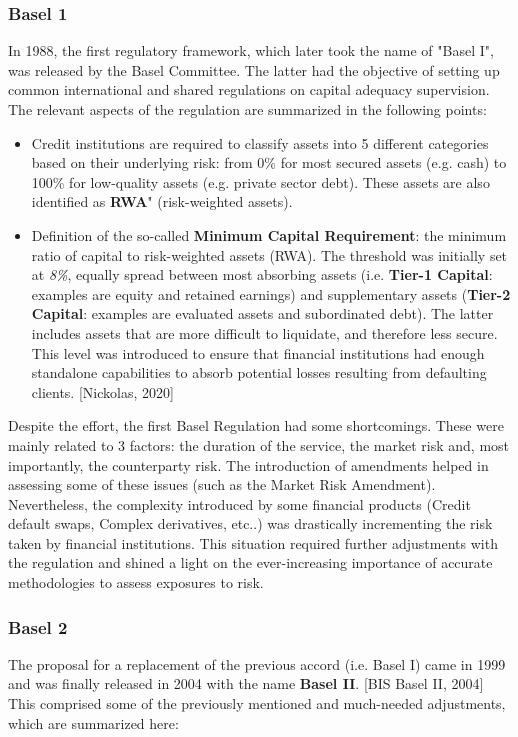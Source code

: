 \documentclass[a4paper,12pt]{article}
\begin{document}
    \subsubsection[]{Basel 1}
    In 1988, the first regulatory framework, which later took the name of "Basel I", 
    was released by the Basel Committee. The latter had the objective of setting up 
    common international and shared regulations on capital adequacy supervision. 
    The relevant aspects of the regulation are summarized in the following points:
    
    \begin{itemize}
        \item Credit institutions are required to classify assets into 5 different categories based on their underlying risk: from 0\% for most secured assets (e.g. cash) to 100\% for low-quality assets (e.g. private sector debt). These assets are also identified as \textbf{RWA}" (risk-weighted assets).
        \item Definition of the so-called \textbf{Minimum Capital Requirement}: the minimum ratio of capital to risk-weighted assets (RWA). The threshold was initially set at \textit{8\%}, equally spread between most absorbing assets (i.e. \textbf{Tier-1 Capital}: examples are equity and retained earnings) and supplementary assets (\textbf{Tier-2 Capital}: examples are evaluated assets and subordinated debt). The latter includes assets that are more difficult to liquidate, and therefore less secure. This level was introduced to ensure that financial institutions had enough standalone capabilities to absorb potential losses resulting from defaulting clients. [Nickolas, 2020]
    \end{itemize}
    
    Despite the effort, the first Basel Regulation had some shortcomings. 
    These were mainly related to 3 factors: 
    the duration of the service, 
    the market risk and, most importantly, 
    the counterparty risk. 
    The introduction of amendments helped in assessing some of these issues
    (such as the Market Risk Amendment). 
    Nevertheless, the complexity introduced by some financial products 
    (Credit default swaps, Complex derivatives, etc..) was drastically incrementing 
    the risk taken by financial institutions. 
    This situation required further adjustments with the regulation and 
    shined a light on the ever-increasing importance of accurate methodologies 
    to assess exposures to risk. 
    
    \subsubsection[]{Basel 2}
    The proposal for a replacement of the previous accord (i.e. Basel I) came in 1999 
    and was finally released in 2004 with the name \textbf{Basel II}. [BIS Basel II, 2004]
    This comprised some of the previously mentioned and much-needed adjustments, 
    which are summarized here:
\end{document}
